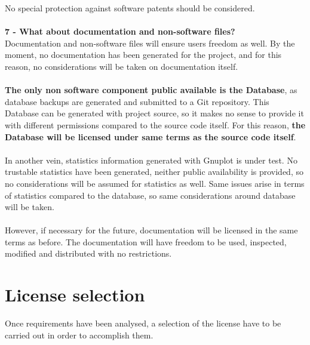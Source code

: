 \documentclass[11pt]{article}
\begin{document}
No special protection against software patents should be considered.\\
\\
\textbf{7 - What about documentation and non-software files?} \\
Documentation and non-software files will ensure users freedom as well. By the moment, no documentation has been generated for the project, and for this reason, no considerations will be taken on documentation itself.\\
\\
\textbf{The only non software component public available is the Database}, as database backups are generated and submitted to a Git repository. This Database can be generated with project source, so it makes no sense to provide it with different permissions compared to the source code itself. For this reason, \textbf{the Database will be licensed under same terms as the source code itself}.\\
\\
In another vein, statistics information generated with Gnuplot is under test. No trustable statistics have been generated, neither public availability is provided, so no considerations will be assumed for statistics as well. Same issues arise in terms of statistics compared to the database, so same considerations around database will be taken. \\
\\
However, if necessary for the future, documentation will be licensed in the same terms as before. The documentation will have freedom to be used, inspected, modified and distributed with no restrictions.

\section{License selection}

Once requirements have been analysed, a selection of the license have to be carried out in order to accomplish them.
\end{document}
